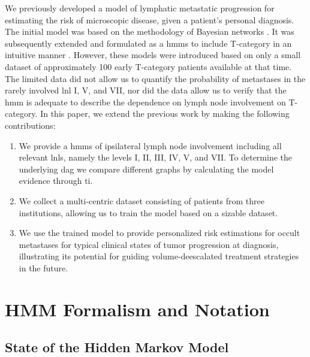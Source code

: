 \documentclass[twocolumn]{aastex631}
\begin{document}
We previously developed a model of lymphatic metastatic progression for estimating the risk of microscopic disease, given a patient's personal diagnosis. The initial model was based on the methodology of Bayesian networks \cite{pouymayou_bayesian_2019}. It was subsequently extended and formulated as a \glspl{hmm} to include T-category in an intuitive manner \cite{ludwig_hidden_2021}. However, these models were introduced based on only a small dataset of approximately 100 early T-category patients \cite{sanguineti_defining_2009} available at that time. The limited data did not allow us to quantify the probability of metastases in the rarely involved \gls{lnl} I, V, and VII, nor did the data allow us to verify that the \gls{hmm} is adequate to describe the dependence on lymph node involvement on T-category.
In this paper, we extend the previous work \cite{ludwig_hidden_2021} by making the following contributions:
\begin{enumerate}
    \item We provide a \glspl{hmm} of ipsilateral lymph node involvement including all relevant \glspl{lnl}, namely the levels I, II, III, IV, V, and VII. To determine the underlying \gls{dag} we compare different graphs by calculating the model evidence through \gls{ti}.
    \item We collect a multi-centric dataset consisting of  patients from three institutions, allowing us to train the model based on a sizable dataset.
    \item We use the trained model to provide personalized risk estimations for occult metastases for typical clinical states of tumor progression at diagnosis, illustrating its potential for guiding volume-deescalated treatment strategies in the future. 
\end{enumerate}



\section{HMM Formalism and Notation}
\label{sec:formalism}



\subsection{State of the Hidden Markov Model}
\label{subsec:formalism:state}
\end{document}
